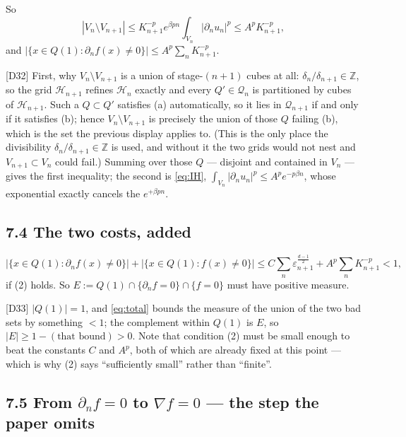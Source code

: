 \documentclass[11pt,reqno]{amsart}
\theoremstyle{plain}
\theoremstyle{definition}
\theoremstyle{plain}
\theoremstyle{definition}
\theoremstyle{remark}
\newcommand{\nd}{\partial_n}
\newcommand{\Ledger}[1]{{\scriptsize\textsf{[#1]}}}
\begin{document}
So
\begin{equation}\label{eq:VnVn1}
 |V_n\setminus V_{n+1}|\le K_{n+1}^{-p}e^{\beta pn}\int_{V_n}\bigl|\nd u_n\bigr|^p
 \le A^pK_{n+1}^{-p},
\end{equation}
and $\bigl|\{x\in Q(1):\nd f(x)\ne0\}\bigr|\le A^p\sum_nK_{n+1}^{-p}$.

\begin{expansion}
\Ledger{D32} First, why $V_n\setminus V_{n+1}$ is a union of stage-$(n{+}1)$
cubes at all: $\delta_n/\delta_{n+1}\in\mathbb Z$, so the grid $\mathcal H_{n+1}$
refines $\mathcal H_n$ exactly and every $Q'\in\mathcal Q_n$ is partitioned by cubes
of $\mathcal H_{n+1}$. Such a $Q\subset Q'$ satisfies (a) automatically, so it lies
in $\mathcal Q_{n+1}$ if and only if it satisfies (b); hence
$V_n\setminus V_{n+1}$ is precisely the union of those $Q$ failing (b), which is the
set the previous display applies to. (This is the only place the divisibility
$\delta_n/\delta_{n+1}\in\mathbb Z$ is used, and without it the two grids would not
nest and $V_{n+1}\subset V_n$ could fail.) Summing over those $Q$ --- disjoint and
contained in $V_n$ --- gives the first inequality; the second is \eqref{eq:IH}, $\int_{V_n}|\nd u_n|^p\le A^pe^{-p\beta n}$,
whose exponential exactly cancels the $e^{+\beta pn}$.
\end{expansion}

\subsection*{7.4 The two costs, added}

\begin{equation}\label{eq:total}
 \bigl|\{x\in Q(1):\nd f(x)\ne0\}\bigr|+\bigl|\{x\in Q(1):f(x)\ne0\}\bigr|
 \le C\sum_n\varepsilon_{n+1}^{\frac{d-1}2}+A^p\sum_nK_{n+1}^{-p}<1,
\end{equation}
if (2) holds. So
$E:=Q(1)\cap\{\nd f=0\}\cap\{f=0\}$ must have positive measure.

\begin{expansion}
\Ledger{D33} $|Q(1)|=1$, and \eqref{eq:total} bounds the measure of the union of the
two bad sets by something $<1$; the complement within $Q(1)$ is $E$, so
$|E|\ge1-(\text{that bound})>0$. Note that condition (2) must be small enough to beat
the constants $C$ and $A^p$, both of which are already fixed at this point --- which
is why (2) says ``sufficiently small'' rather than ``finite''.
\end{expansion}

\subsection*{7.5 From $\nd f=0$ to $\nabla f=0$ --- the step the paper omits}
\end{document}
